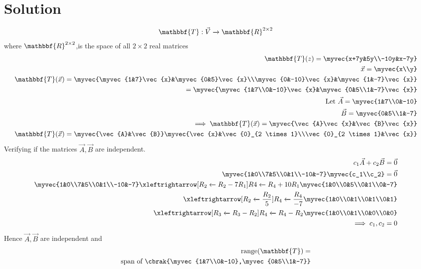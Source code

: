 \documentclass[journal,12pt,twocolumn]{IEEEtran}
\begin{document}
\section{Solution}
\begin{align}
    \mathbbf{T}:\vec{V}\xrightarrow{}\mathbbf{R}^{2 \times 2}
\end{align}
where $\mathbbf{R}^{2 \times 2}$,is the space of all $2 \times 2$ real matrices\\
\begin{align}
 \mathbbf{T}(z)=\myvec{x+7y&5y\\-10y&x-7y}\\
 \vec{x}=\myvec{x\\y}\\
 \mathbbf{T}(\vec{x})=\myvec{\myvec{1&7}\vec{x}&\myvec{0&5}\vec{x}\\\myvec{0&-10}\vec{x}&\myvec{1&-7}\vec{x}}\\
 =\myvec{\myvec{1&7\\0&-10}\vec{x}&\myvec{0&5\\1&-7}\vec{x}}\\
 \text{Let } \vec{A}=\myvec{1&7\\0&-10}\\
 \vec{B}=\myvec{0&5\\1&-7}\\
 \implies  \mathbbf{T}(\vec{x})=\myvec{\vec{A}\vec{x}&\vec{B}\vec{x}}\\
  \mathbbf{T}(\vec{x})=\myvec{\vec{A}&\vec{B}}\myvec{\vec{x}&\vec{0}_{2 \times 1}\\\vec{0}_{2 \times 1}&\vec{x}}
\end{align}
Verifying if the matrices $\vec{A},\vec{B}$ are independent.
\begin{align}
    c_1\vec{A}+c_2\vec{B}=\vec{0}\\
    \myvec{1&0\\7&5\\0&1\\-10&-7}\myvec{c_1\\c_2}=\vec{0}\\
    \myvec{1&0\\7&5\\0&1\\-10&-7}\xleftrightarrow[R_2\xleftarrow{}R_2-7R_1]{R4\xleftarrow{}R_4+10R_1}\myvec{1&0\\0&5\\0&1\\0&-7}\\
    \xleftrightarrow[R_2\xleftarrow{}\frac{R_2}{5}]{R_4\xleftarrow{}\frac{R_4}{-7}}\myvec{1&0\\0&1\\0&1\\0&1}\\
     \xleftrightarrow[R_3\xleftarrow{}R_3-R_2]{R_4\xleftarrow{}R_4-R_2}\myvec{1&0\\0&1\\0&0\\0&0}\\
     \implies c_1,c_2=0
\end{align}
Hence $\vec{A},\vec{B}$ are independent and 
\begin{align}
    \text{range}(\mathbbf{T})=\\\text{span of }\cbrak{\myvec{1&7\\0&-10},\myvec{0&5\\1&-7}}
\end{align}
\end{document}
